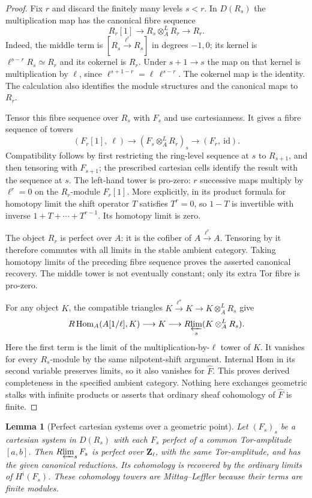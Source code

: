 \documentclass[11pt]{article}
\newtheorem{lemma}[theorem]{Lemma}
\theoremstyle{definition}
\theoremstyle{remark}
\begin{document}
\begin{proof}
Fix $r$ and discard the finitely many levels $s<r$.  In $D(R_s)$
the multiplication map has the canonical fibre sequence
\[
 R_r[1]\longrightarrow R_s\otimes^L_A R_r
                  \longrightarrow R_r.
\]
Indeed, the middle term is $[R_s\xrightarrow{\ell^r}R_s]$
in degrees $-1,0$; its kernel is $\ell^{s-r}R_s\simeq R_r$ and
its cokernel is $R_r$.  Under $s+1\to s$ the map on that kernel
is multiplication by $\ell$, since
$\ell^{s+1-r}=\ell\,\ell^{s-r}$.  The cokernel map is the identity.
The calculation also identifies the module structures and the
canonical maps to $R_r$.

Tensor this fibre sequence over $R_s$ with $F_s$ and use
cartesianness.  It gives a fibre sequence of towers
\[
 (F_r[1],\ \ell)\longrightarrow
 (F_s\otimes^L_A R_r)_s\longrightarrow(F_r,\ \mathrm{id}).
\]
Compatibility follows by first restricting the ring-level sequence
at $s$ to $R_{s+1}$, and then tensoring with $F_{s+1}$; the prescribed
cartesian cells identify the result with the sequence at $s$.
The left-hand tower is pro-zero: $r$ successive maps multiply by
$\ell^r=0$ on the $R_r$-module $F_r[1]$.  More explicitly, in its
product formula for homotopy limit the shift operator $T$ satisfies
$T^r=0$, so $1-T$ is invertible with inverse
$1+T+\cdots+T^{r-1}$.  Its homotopy limit is zero.

The object $R_r$ is perfect over $A$: it is the cofiber of
$A\xrightarrow{\ell^r}A$.  Tensoring by it therefore commutes with
all limits in the stable ambient category.  Taking homotopy limits
of the preceding fibre sequence proves the asserted canonical
recovery.  The middle tower is not eventually constant; only its
extra Tor fibre is pro-zero.

For any object $K$, the compatible triangles
$K\xrightarrow{\ell^s}K\to K\otimes^L_A R_s$ give
\[
 R\operatorname{Hom}_A(A[1/\ell],K)\longrightarrow K
       \longrightarrow R\!\varprojlim_s(K\otimes^L_A R_s).
\]
Here the first term is the limit of the multiplication-by-$\ell$
tower of $K$.  It vanishes for every $R_s$-module by the same
nilpotent-shift argument.  Internal Hom in its second variable
preserves limits, so it also vanishes for $\widehat F$.
This proves derived completeness in the specified ambient category.
Nothing here exchanges geometric stalks with infinite products or
asserts that ordinary sheaf cohomology of $\widehat F$ is finite.
\end{proof}

\begin{lemma}[Perfect cartesian systems over a geometric point]
\label{lem:frag-point-perfect-recovery}
Let $(F_s)_s$ be a cartesian system in $D(R_s)$ with each $F_s$
perfect of a common Tor-amplitude $[a,b]$.  Then
$R\!\varprojlim_sF_s$ is perfect over $\mathbf Z_\ell$, with the
same Tor-amplitude, and has the given canonical reductions.
Its cohomology is recovered by the ordinary limits of $H^i(F_s)$.
These cohomology towers are Mittag--Leffler because their terms
are finite modules.
\end{lemma}
\end{document}
